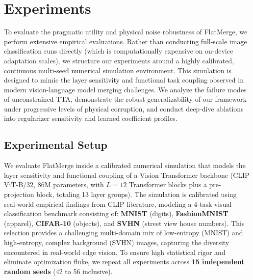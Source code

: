 \section{Experiments}
\label{sec:experiments}

To evaluate the pragmatic utility and physical noise robustness of FlatMerge, we perform extensive empirical evaluations. 
Rather than conducting full-scale image classification runs directly (which is computationally expensive on on-device adaptation scales), we structure our experiments around a highly calibrated, continuous multi-seed numerical simulation environment. 
This simulation is designed to mimic the layer sensitivity and functional task coupling observed in modern vision-language model merging challenges. 
We analyze the failure modes of unconstrained TTA, demonstrate the robust generalizability of our framework under progressive levels of physical corruption, and conduct deep-dive ablations into regularizer sensitivity and learned coefficient profiles.

\subsection{Experimental Setup}
We evaluate FlatMerge inside a calibrated numerical simulation that models the layer sensitivity and functional coupling of a Vision Transformer backbone (CLIP ViT-B/32, 86M parameters, with $L=12$ Transformer blocks plus a pre-projection block, totaling 13 layer groups). 
The simulation is calibrated using real-world empirical findings from CLIP literature, modeling a 4-task visual classification benchmark consisting of:
\textbf{MNIST} (digits), \textbf{FashionMNIST} (apparel), \textbf{CIFAR-10} (objects), and \textbf{SVHN} (street view house numbers). 
This selection provides a challenging multi-domain mix of low-entropy (MNIST) and high-entropy, complex background (SVHN) images, capturing the diversity encountered in real-world edge vision.
To ensure high statistical rigor and eliminate optimization fluke, we repeat all experiments across \textbf{15 independent random seeds} (42 to 56 inclusive).

